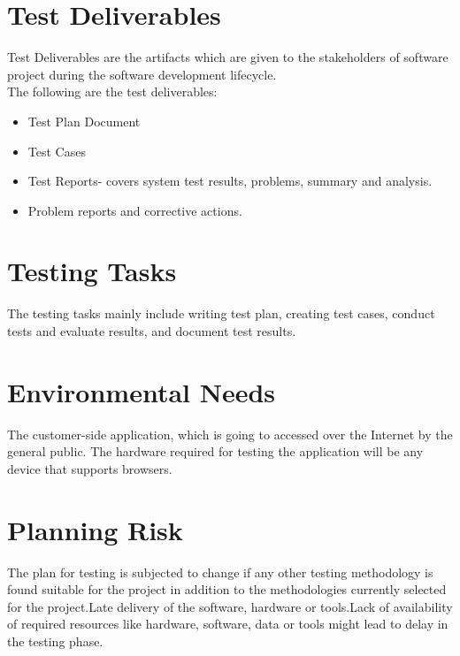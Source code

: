 \documentclass[12pt]{article}
\begin{document}
    \section{Test Deliverables}
    Test Deliverables are the artifacts which are given to the stakeholders of software project during the software development lifecycle.\\The following are the test deliverables:
    \begin{itemize}
        \item Test Plan Document
        \item Test Cases
        \item Test Reports- covers system test results, problems, summary and analysis.
        \item Problem reports and corrective actions.
    \end{itemize}
    
    \section{Testing Tasks}
    The testing tasks mainly include writing test plan, creating test cases, conduct tests and evaluate results, and document test results.
    
    \section{Environmental Needs}
    The customer-side application, which is going to accessed over the Internet by the general public. The hardware required for testing the application will be any device that supports browsers.
    
    \section{Planning Risk}
    The plan for testing is subjected to change if any other testing methodology is found suitable for the project in addition to the methodologies currently selected for the project.Late delivery of the software, hardware or tools.Lack of availability of required resources like hardware, software, data or tools might lead to delay in the testing phase.
    
    
	
\end{document}
